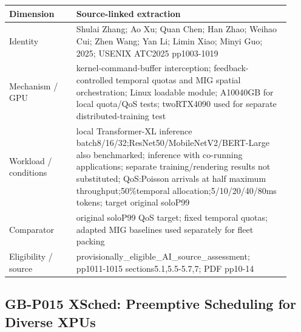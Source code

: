 \documentclass[12pt,a4paper]{article}
\begin{document}
{\small\begin{longtable}{>{\raggedright\arraybackslash}p{0.22\linewidth}>{\raggedright\arraybackslash}p{0.7\linewidth}}
\toprule
Dimension & Source-linked extraction\\\midrule
\endhead
Identity & Shulai Zhang; Ao Xu; Quan Chen; Han Zhao; Weihao Cui; Zhen Wang; Yan Li; Limin Xiao; Minyi Guo; 2025; USENIX ATC2025 pp1003-1019\\
Mechanism /\allowbreak{} GPU & kernel-command-buffer interception; feedback-controlled temporal quotas and MIG spatial orchestration; Linux loadable module; A10040GB for local quota/\allowbreak{}QoS tests; twoRTX4090 used for separate distributed-training test\\
Workload /\allowbreak{} conditions & local Transformer-XL inference batch8/\allowbreak{}16/\allowbreak{}32;ResNet50/\allowbreak{}MobileNetV2/\allowbreak{}BERT-Large also benchmarked; inference with co-running applications; separate training/\allowbreak{}rendering results not substituted; QoS:\allowbreak{}Poisson arrivals at half maximum throughput;50\%temporal allocation;5/\allowbreak{}10/\allowbreak{}20/\allowbreak{}40/\allowbreak{}80ms tokens; target original soloP99\\
Comparator & original soloP99 QoS target; fixed temporal quotas; adapted MIG baselines used separately for fleet packing\\
Eligibility /\allowbreak{} source & provisionally\_\allowbreak{}eligible\_\allowbreak{}AI\_\allowbreak{}source\_\allowbreak{}assessment; pp1011-1015 sections5.1,5.5-5.7,7; PDF pp10-14\\
\bottomrule
\end{longtable}}

\subsection*{GB-P015 XSched:\allowbreak{} Preemptive Scheduling for Diverse XPUs}
\cite{GB-P015}
\end{document}
